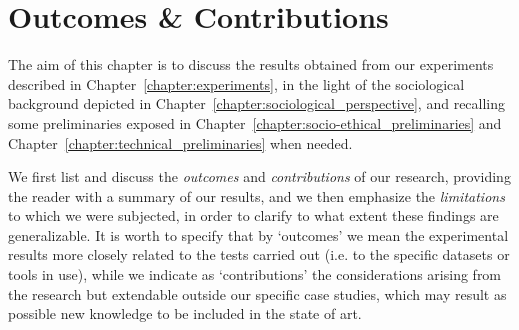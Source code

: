 \chapter{Outcomes \& Contributions}
\label{chapter:outcomes_contributions}
\thispagestyle{empty}

The aim of this chapter is to discuss the results obtained from our experiments described in Chapter~\ref{chapter:experiments}, in the light of the sociological background depicted in Chapter~\ref{chapter:sociological_perspective}, and recalling some preliminaries exposed in Chapter~\ref{chapter:socio-ethical_preliminaries} and Chapter~\ref{chapter:technical_preliminaries} when needed.

We first list and discuss the \textit{outcomes} and \textit{contributions} of our research, providing the reader with a summary of our results, and we then emphasize the \textit{limitations} to which we were subjected, in order to clarify to what extent these findings are generalizable. It is worth to specify that by `outcomes' we mean the experimental results more closely related to the tests carried out (i.e. to the specific datasets or tools in use), while we indicate as `contributions' the considerations arising from the research but extendable outside our specific case studies, which may result as possible new knowledge to be included in the state of art.


